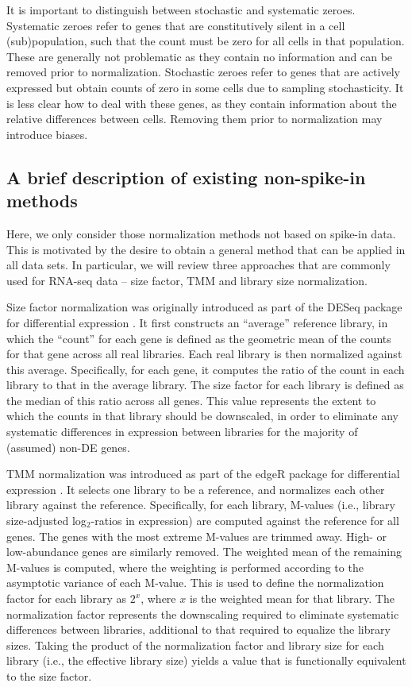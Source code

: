 \documentclass{article}
\begin{document}
It is important to distinguish between stochastic and systematic zeroes.
Systematic zeroes refer to genes that are constitutively silent in a cell (sub)population, such that the count must be zero for all cells in that population.
These are generally not problematic as they contain no information and can be removed prior to normalization.
Stochastic zeroes refer to genes that are actively expressed but obtain counts of zero in some cells due to sampling stochasticity.
It is less clear how to deal with these genes, as they contain information about the relative differences between cells.
Removing them prior to normalization may introduce biases.

\subsection{A brief description of existing non-spike-in methods}
Here, we only consider those normalization methods not based on spike-in data.
This is motivated by the desire to obtain a general method that can be applied in all data sets.
In particular, we will review three approaches that are commonly used for RNA-seq data -- size factor, TMM and library size normalization.

Size factor normalization was originally introduced as part of the DESeq package for differential expression \cite{anders2010differential}.
It first constructs an ``average'' reference library, in which the ``count'' for each gene is defined as the geometric mean of the counts for that gene across all real libraries.
Each real library is then normalized against this average.
Specifically, for each gene, it computes the ratio of the count in each library to that in the average library.
The size factor for each library is defined as the median of this ratio across all genes.
This value represents the extent to which the counts in that library should be downscaled, 
    in order to eliminate any systematic differences in expression between libraries for the majority of (assumed) non-DE genes.

TMM normalization was introduced as part of the edgeR package for differential expression \cite{robinson2010edgeR}.
It selects one library to be a reference, and normalizes each other library against the reference.
Specifically, for each library, M-values (i.e., library size-adjusted log$_2$-ratios in expression) are computed against the reference for all genes.
The genes with the most extreme M-values are trimmed away.
High- or low-abundance genes are similarly removed.
The weighted mean of the remaining M-values is computed, where the weighting is performed according to the asymptotic variance of each M-value.
This is used to define the normalization factor for each library as $2^x$, where $x$ is the weighted mean for that library.
The normalization factor represents the downscaling required to eliminate systematic differences between libraries, additional to that required to equalize the library sizes.
Taking the product of the normalization factor and library size for each library (i.e., the effective library size) yields a value that is functionally equivalent to the size factor.
\end{document}
